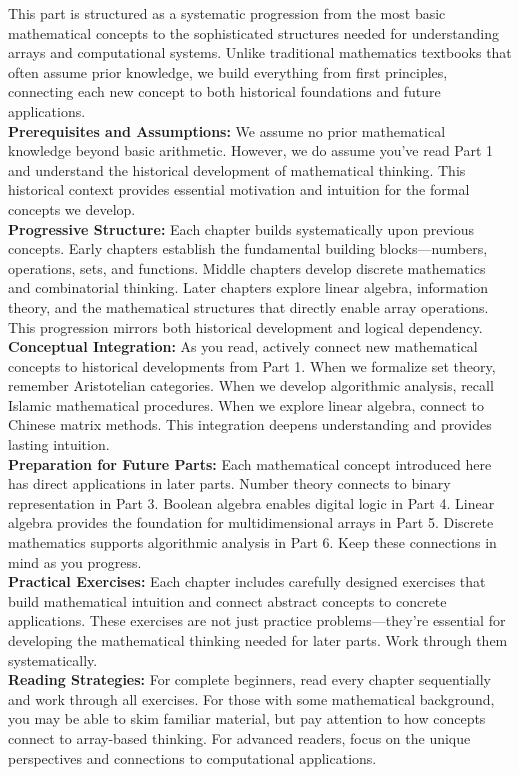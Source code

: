 \documentclass[12pt, oneside, openany]{book}
\begin{document}
This part is structured as a systematic progression from the most basic mathematical concepts to the sophisticated structures needed for understanding arrays and computational systems. Unlike traditional mathematics textbooks that often assume prior knowledge, we build everything from first principles, connecting each new concept to both historical foundations and future applications.\\
\textbf{Prerequisites and Assumptions:} We assume no prior mathematical knowledge beyond basic arithmetic. However, we do assume you've read Part 1 and understand the historical development of mathematical thinking. This historical context provides essential motivation and intuition for the formal concepts we develop.\\
\textbf{Progressive Structure:} Each chapter builds systematically upon previous concepts. Early chapters establish the fundamental building blocks—numbers, operations, sets, and functions. Middle chapters develop discrete mathematics and combinatorial thinking. Later chapters explore linear algebra, information theory, and the mathematical structures that directly enable array operations. This progression mirrors both historical development and logical dependency.\\
\textbf{Conceptual Integration:} As you read, actively connect new mathematical concepts to historical developments from Part 1. When we formalize set theory, remember Aristotelian categories. When we develop algorithmic analysis, recall Islamic mathematical procedures. When we explore linear algebra, connect to Chinese matrix methods. This integration deepens understanding and provides lasting intuition.\\
\textbf{Preparation for Future Parts:} Each mathematical concept introduced here has direct applications in later parts. Number theory connects to binary representation in Part 3. Boolean algebra enables digital logic in Part 4. Linear algebra provides the foundation for multidimensional arrays in Part 5. Discrete mathematics supports algorithmic analysis in Part 6. Keep these connections in mind as you progress.\\
\textbf{Practical Exercises:} Each chapter includes carefully designed exercises that build mathematical intuition and connect abstract concepts to concrete applications. These exercises are not just practice problems—they're essential for developing the mathematical thinking needed for later parts. Work through them systematically.\\
\textbf{Reading Strategies:} For complete beginners, read every chapter sequentially and work through all exercises. For those with some mathematical background, you may be able to skim familiar material, but pay attention to how concepts connect to array-based thinking. For advanced readers, focus on the unique perspectives and connections to computational applications.\\
\end{document}
